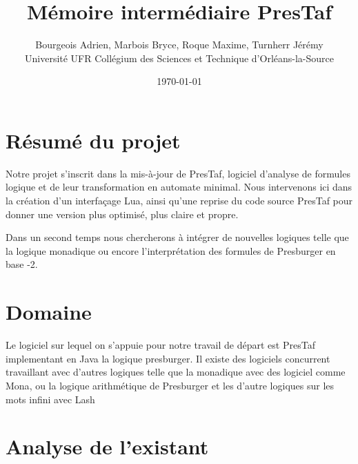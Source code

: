 \documentclass{article}%
\begin{document}
\title{Mémoire intermédiaire PresTaf}


\author{Bourgeois Adrien, Marbois Bryce, Roque Maxime, Turnherr Jérémy%
\\Université UFR Collégium des Sciences et Technique d'Orléans-la-Source}
\date{\today}
\maketitle



\clearpage

\tableofcontents

\cleardoublepage

\section{Résumé du projet}

Notre projet s'inscrit dans la mis-à-jour de PresTaf, logiciel d'analyse de formules logique et de leur transformation en automate minimal. Nous intervenons ici dans la création d'un interfaçage Lua, ainsi qu'une reprise du code source PresTaf pour donner une version plus optimisé, plus claire et propre.\\\par

Dans un second temps nous chercherons à intégrer de nouvelles logiques telle que la logique monadique ou encore l'interprétation des formules de Presburger en base -2.

\section{Domaine}

Le logiciel sur lequel on s'appuie pour notre travail de départ est PresTaf implementant en Java la logique \gls{presburger}\cite{ginsburg1966semigroups}. Il existe des logiciels concurrent travaillant avec d'autres logiques telle que la \gls{monadique}\cite{KlaEtAl:Mona} avec des logiciel comme Mona\cite{monamanual2001}, ou la logique arithmétique de Presburger et les d'autre logiques sur les mots infini avec Lash\cite{lash}

\section{Analyse de l'existant}
\end{document}
